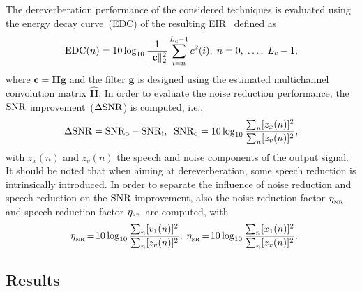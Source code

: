 \documentclass{article}
\begin{document}
The dereverberation performance of the considered techniques is evaluated using the energy decay curve~(EDC) of the resulting EIR~\cite{Naylor_Derev_book} defined as
\begin{equation}
{\rm EDC}(n) = 10 \log_{10} \frac{1}{\|\mathbf{c}\|_2^2} \sum_{i = n}^{L_c-1} c^2(i), \; n =0, \; \ldots, \; L_c-1,
\end{equation}
where $\mathbf{c} = \mathbf{H}\mathbf{g}$ and the filter $\mathbf{g}$ is designed using the estimated multichannel convolution matrix $\hat{\mathbf{H}}$.
In order to evaluate the noise reduction performance, the $\rm SNR$ improvement~($\Delta {\rm SNR}$) is computed, i.e.,
\begin{equation}
\Delta {\rm SNR} = {\rm SNR}_{\rm o} - {\rm SNR}_{\rm i}, \; \;  {\rm SNR}_{\rm o} = 10 \log_{10} \frac{\sum_n [z_x(n)]^2}{\sum_n [z_v(n)]^2},
\end{equation}
with $z_x(n)$ and $z_v(n)$ the speech and noise components of the output signal.
It should be noted that when aiming at dereverberation, some speech reduction is intrinsically introduced. 
In order to separate the influence of noise reduction and speech reduction on the $ \rm SNR$ improvement, also the noise reduction factor $\eta_{_{\rm NR}}$ and speech reduction factor $\eta_{_{\rm SR}}$ are computed, with
\begin{equation}
\eta_{_{\rm NR}} \! = \! 10 \log_{10} \frac{\sum_n[v_1(n)]^2}{\sum_n[z_v(n)]^2}, \; \eta_{_{\rm SR}} \! = \! 10 \log_{10} \frac{\sum_n[x_1(n)]^2}{\sum_n[z_x(n)]^2}. \! \! \! \!
\end{equation}

\vspace{-0.6cm}
\subsection{Results}
\end{document}
